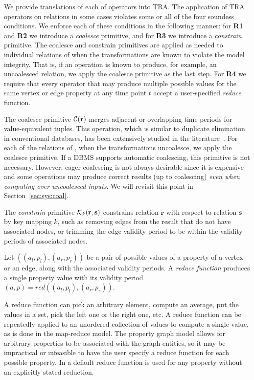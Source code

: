 We provide translations of each of \ql operators into TRA.  The
application of TRA operators on \tve relations in some cases violates
some or all of the four soundess conditions.  We enforce each of these
conditions in the following manner: for {\bf R1} and {\bf R2} we
introduce a {\em coalesce} primitive, and for {\bf R3} we introduce a
{\em constrain} primitive.  The coalesce and constrain primitives are
applied as needed to individual relations of \tve when the
transformations are known to violate the model integrity.  That is, if
an operation is known to produce, for example, an uncoalesced
relation, we apply the coalesce primitive as the last step.  For {\bf
  R4} we require that every operator that may produce multiple
possible values for the same vertex or edge property at any time point
$t$ accept a user-specified {\em reduce} function.

The coalesce primitive $\mathcal{C}(\mathbf{r})$ merges adjacent or overlapping time
periods for value-equivalent tuples.  This operation, which is similar
to duplicate elimination in conventional databases, has been
extensively studied in the
literature~\cite{DBLP:conf/vldb/BohlenSS96,DBLP:journals/sigmod/Zimanyi06}.
For each of the relations of \tve, when the transformations
uncoalesce, we apply the coalesce primitive.  If a DBMS supports
automatic coalescing, this primitive is not necessary.  However, eager
coalescing is not always desirable since it is expensive and some
operations may produce correct results (up to coalescing) {\em even
  when computing over uncoalesced inputs}.  We will revisit this point in
Section~\ref{sec:sys:coal}.

The {\em constrain} primitive $\mathcal{K}_{k}(\mathbf{r},\mathbf{s})$ constrains relation
$\mathbf{r}$ with respect to relation $\mathbf{s}$ by key mapping $k$,
such as removing edges from the result that do not have associated
nodes, or trimming the edge validity period to be within the validity
periods of associated nodes.

\begin{definition}
Let $((a_l,p_l),(a_r,p_r))$ be a pair of possible values of a property
of a vertex or an edge, along with the associated validity periods.  A
{\em reduce function} produces a single property value with its
validity period $(a,p) = red((a_l,p_l), (a_r,p_r))$.
\end{definition}

A reduce function can pick an arbitrary element, compute an average,
put the values in a set, pick the left one or the right one, etc.  A
reduce function can be repeatedly applied to an unordered collection
of values to compute a single value, as is done in the map-reduce
model.  The property graph model allows for arbitrary properties to be
associated with the graph entities, so it may be impractical or
infeasible to have the user specify a reduce function for each
possible property.  In \ql a default reduce function  is
used for any property without an explicitly stated reduction.


